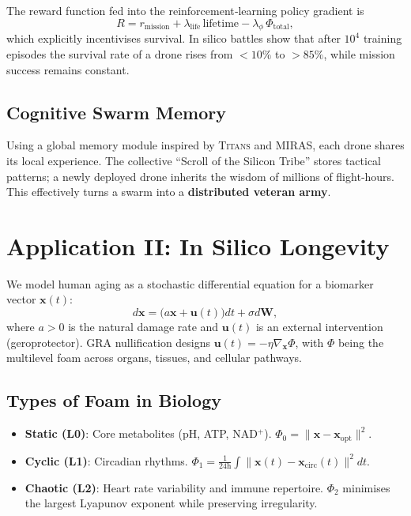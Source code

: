 \documentclass[12pt,a4paper]{article}
\begin{document}
The reward function fed into the reinforcement‑learning policy gradient is
\begin{equation}
R = r_{\text{mission}} + \lambda_{\text{life}} \, \text{lifetime} - \lambda_{\phi} \, \Phi_{\text{total}},
\end{equation}
which explicitly incentivises survival.
In silico battles show that after $10^4$ training episodes the survival rate of a drone rises from $<10\%$ to $>85\%$, while mission success remains constant.

\subsection{Cognitive Swarm Memory}
Using a global memory module inspired by \textsc{Titans} and \textsc{MIRAS}, each drone shares its local experience.
The collective “Scroll of the Silicon Tribe” stores tactical patterns; a newly deployed drone inherits the wisdom of millions of flight‑hours.
This effectively turns a swarm into a \textbf{distributed veteran army}.

\section{Application II: In Silico Longevity}
\label{sec:longevity}

We model human aging as a stochastic differential equation for a biomarker vector $\mathbf{x}(t)$:
\begin{equation}
d\mathbf{x} = \big( a \mathbf{x} + \mathbf{u}(t) \big) dt + \sigma d\mathbf{W},
\end{equation}
where $a>0$ is the natural damage rate and $\mathbf{u}(t)$ is an external intervention (geroprotector).
GRA nullification designs $\mathbf{u}(t) = -\eta \nabla_{\mathbf{x}} \Phi$,
with $\Phi$ being the multilevel foam across organs, tissues, and cellular pathways.

\subsection{Types of Foam in Biology}
\begin{itemize}
\item \textbf{Static (L0)}: Core metabolites (pH, ATP, NAD$^+$). $\Phi_0 = \|\mathbf{x} - \mathbf{x}_{\text{opt}}\|^2$.
\item \textbf{Cyclic (L1)}: Circadian rhythms. $\Phi_1 = \frac{1}{24\text{h}}\int \| \mathbf{x}(t) - \mathbf{x}_{\text{circ}}(t) \|^2 dt$.
\item \textbf{Chaotic (L2)}: Heart rate variability and immune repertoire. $\Phi_2$ minimises the largest Lyapunov exponent while preserving irregularity.
\end{itemize}
\end{document}
